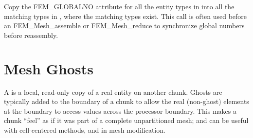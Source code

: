 
Copy the FEM\_GLOBALNO attribute for all the entity types in 
 into all the matching types in ,
where the matching types exist.  This call is often used 
before an FEM\_Mesh\_assemble or FEM\_Mesh\_reduce to synchronize
global numbers before reassembly.



\section{Mesh Ghosts}
\label{sec:ghost}

A  is a local, read-only copy of a real entity
on another chunk. Ghosts are typically added to the boundary of a chunk to allow the real (non-ghost) elements at the boundary to access values across the processor boundary.  This makes a chunk ``feel'' as if it was part of a complete unpartitioned mesh; and can be useful with cell-centered methods, and in mesh modification.

